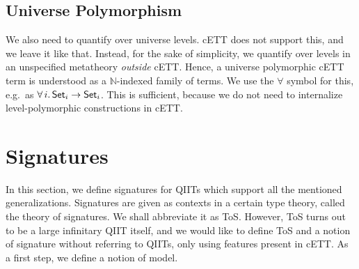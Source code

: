 \documentclass{llncs}
\begin{document}
\subsection{Universe Polymorphism}
\label{sec:universe_polymorphism}

We also need to quantify over universe levels. cETT does not support this, and
we leave it like that. Instead, for the sake of simplicity, we quantify over
levels in an unspecified metatheory \emph{outside} cETT. Hence, a universe
polymorphic cETT term is understood as a $\mathbb{N}$-indexed family of
terms. We use the $\forall$ symbol for this, e.g.\ as $\forall\,i.\,\mathsf{Set}_i \rightarrow
\mathsf{Set}_i$. This is sufficient, because we do not need to internalize
level-polymorphic constructions in cETT.

\section{Signatures}
\label{sec:tos}

In this section, we define signatures for QIITs which support all the mentioned
generalizations. Signatures are given as contexts in a certain type theory,
called the theory of signatures. We shall abbreviate it as ToS. However, ToS
turns out to be a large infinitary QIIT itself, and we would like to define ToS
and a notion of signature without referring to QIITs, only using features
present in cETT. As a first step, we define a notion of model.
\end{document}
